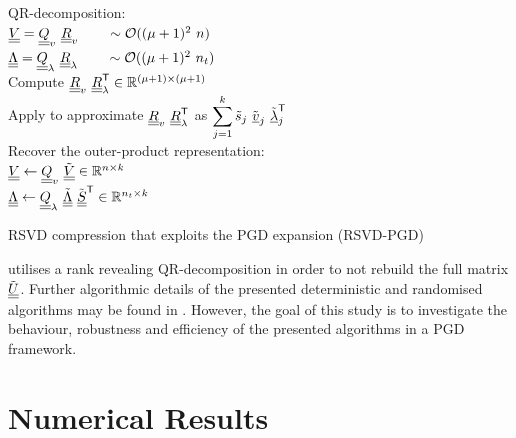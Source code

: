 \begin{algorithm}[hbt!]
	\vspace{0.2cm}
	\vspace{0.2cm}

	QR-decomposition:\\
	\qquad $\underline{\underline{V}} =  \underline{\underline{Q}}_v \ \underline{\underline{R}}_v \qquad \sim{\cal O} ((\mu+1)^2 \ n)$\\
	\qquad $\underline{\underline{\Lambda}} = \underline{\underline{Q}}_\lambda \ \underline{\underline{R}}_\lambda \qquad \sim {\cal O} ((\mu+1)^2 \ n_t)$    \\
	Compute $\underline{\underline{R}}_v \ {\underline{\underline{R}}}^{\sf T}_\lambda \in {\mathbb{ R}}^{(\mu+1)\times(\mu+1)}$\\
	Apply  to approximate $\mR_v \ \T{\mR}_\lambda$ as $\displaystyle\sum_{j=1}^{k} {\tilde{s}}_j \ {\tilde{\underline{v}}}_j \ {{\tilde{\underline{\lambda}}}}^{\sf T}_j$  \\
	Recover the outer-product representation:\\
	\qquad $\underline{\underline{V}} \leftarrow \underline{\underline{Q}}_v \ {\tilde{\underline{\underline{V}}}} \in {\mathbb{ R}}^{n\times k} $\\[0.1cm]
	\qquad $\underline{\underline{\Lambda}} \leftarrow  \underline{\underline{Q}}_\lambda \ {\tilde{\underline{\underline{\Lambda}}}} \ {{\tilde{\underline{\underline{S}}}}}^{\sf T} \in {\mathbb{ R}}^{n_t \times k} $

	\caption{RSVD compression that exploits the PGD expansion (RSVD-PGD)}
	\label{alg:svd_decomposition}
\end{algorithm}

 utilises a rank revealing QR-decomposition in order to not rebuild the full matrix ${\tilde{\underline{\underline{U}}}}$. Further algorithmic details of the presented deterministic and randomised algorithms may be found in \parencite{Golub_VanLoan_1996,Bach_Ceglia_2018,halko2011finding}. However, the goal of this study is to investigate the behaviour, robustness and efficiency of the presented algorithms in a PGD framework.

\section{Numerical Results}
\label{sec_examples}

